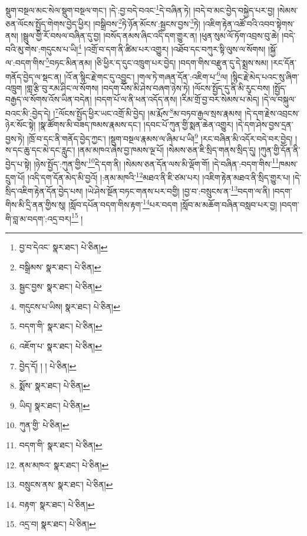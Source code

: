 སྡུག་བསྔལ་མང་སེལ་སྡུག་བསྔལ་གང་། །དེ་:བྱ་བདེ་བའང་\footnote{བྱ་བ་དེའང་  སྣར་ཐང་།  པེ་ཅིན། }དེ་བཞིན་ཏེ། །བདེ་བ་མང་བྱེད་བསྐྱེད་པར་བྱ། །སེམས་ཅན་ལོངས་སྤྱོད་གེགས་བྱེད་ཕྱིར། །བསྒྲིབས་\footnote{བསྒྲིམས་  སྣར་ཐང་།  པེ་ཅིན། }ཏེ་ཉོན་མོངས་:སྦྱངས་བྱས་\footnote{སྦྱང་བྱས་  སྣར་ཐང་།  པེ་ཅིན། }ཏེ། །འཇིག་རྟེན་འཚོ་བའི་འབབ་སྟེགས་ནས། །སྦྲུལ་གྱི་རོ་བསལ་བཞིན་དུ་བྱ། །བསོད་ནམས་ཞིང་འདི་དག་གྱུར་ན། །ཕུན་སུམ་ལོ་ཏོག་འབྲས་བུ་ཆེ། །བདེ་བའི་མུ་གེས་:གདུངས་པ་ཡི།\footnote{གདུངས་པ་ཡིས།  སྣར་ཐང་།  པེ་ཅིན། } །འགྲོ་བ་དག་ནི་ཚིམ་པར་འགྱུར། །འཐོབ་དང་བཀུར་སྟི་ལུས་ལ་སོགས། །སྐྱོ་ལ་:བདག་གིས་\footnote{བདག་གི་  སྣར་ཐང་།  པེ་ཅིན། }བཏང་མིན་ནམ། །ཅི་ཕྱིར་ད་དུང་འཁྲུག་པར་བྱེད། །བདག་གིས་བརྫུན་དུ་དེ་སྨྲས་སམ། །རང་དོན་གནོད་བྱེད་ལ་སྡང་ན། །འོ་ན་སྙིང་རྗེ་གང་དུ་འབྱུང་། །གལ་ཏེ་གཞན་དོན་:འཇིག་པ་\footnote{འཇོག་པ་  སྣར་ཐང་།  པེ་ཅིན། }ལ། །སྙིང་རྗེ་མེད་པའང་སུ་ཞིག་འཁྲུག །གླ་རྩི་བུ་རམ་ཤིང་ལ་སོགས། །བདག་པོས་མི་ཤེས་བཞག་ཉེས་ཏེ། །ལོངས་སྤྱོད་དུ་ནི་མི་རུང་བས། །སྤྱོད་བརྒྱད་ལ་སོགས་འོས་ཡིན་བདེན། །བདག་པོ་ལ་ནི་ཕན་འདོད་ནས། །རིམ་གྲོ་བྱ་བར་སེམས་པ་མེད། །དེ་ལ་བསྐུལ་བའང་མི་:བྱེད་དེ། །\footnote{བྱེད་དོ། ། །  པེ་ཅིན། }ལོངས་སྤྱོད་ཕྱིར་ཡང་འགྲོ་མི་བྱེད། །མ་རྨོས་\footnote{སྨོས་  སྣར་ཐང་།  པེ་ཅིན། }མ་བཏབ་རྒྱལ་སྲས་རྣམས། །དེ་དག་རྗེས་འབྲངས་ཉེར་སོང་སྟེ། །སྣ་ཚོགས་མི་བཟད་ཁམས་རྣམས་དང་། །དབང་པོ་ཀུན་གྱི་སྨན་ཆེན་འགྱུར། །དེ་དག་ཤེས་བྱས་དྲན་བྱས་ཏེ། །ཁྲོ་བ་དང་ནི་གནོད་བྱེད་ཀྱང་། །སྡུག་བསྔལ་རྣམས་ལ་ཞིམ་པ་ཡི།\footnote{ཡིད།  སྣར་ཐང་།  པེ་ཅིན། } །རང་བཞིན་མི་འདོར་བདེ་བར་བྱེད། །ས་དང་ཆུ་དང་མེ་དང་རླུང་། །ནམ་མཁའ་ཞེས་བྱ་ཁམས་ལྔ་པོ། །སེམས་ཅན་ཇི་སྲིད་གནས་སྲིད་དུ། །ཀུན་གྱི་དོན་ནི་བྱེད་པ་སྟེ། །ཉེས་སྤྱོད་:ཀུན་གྱིས་\footnote{ཀུན་གྱི་  པེ་ཅིན། }དེ་དག་ནི། །སེམས་ཅན་དོན་ལས་མི་ལྡོག་གོ། །དེ་བཞིན་:བདག་གིས་\footnote{བདག་གི་  སྣར་ཐང་།  པེ་ཅིན། }ཁམས་དྲུག་པོ། །འདི་དག་དོན་མེད་མི་བྱའོ། །:ནམ་མཁའི་\footnote{ནམ་མཁའ་  སྣར་ཐང་།  པེ་ཅིན། }མཐའ་ནི་ཇི་ཙམ་པར། །འཇིག་རྟེན་མཐའ་ནི་སྲིད་གྱུར་པ། །དེ་སྲིད་འཇིག་རྟེན་དོན་བྱེད་པས། །ཡེ་ཤེས་སྔོན་བཏང་གནས་པར་བགྱི། །བྱ་བ་:བསྲུངས་ན་\footnote{བསྲུངས་ནས་  སྣར་ཐང་།  པེ་ཅིན། }བདག་ལ་ནི། །བདག་གིས་མི་དྲི་ནན་གྱིས་སུ། །སློབ་དཔོན་བདག་གིས་རྟག་\footnote{བརྟག་  སྣར་ཐང་།  པེ་ཅིན། }པར་བདག །སློབ་མ་མཆོག་བཞིན་བསླབ་པར་བྱ། །བདག་གི་བླ་མ་བདག་:འདྲ་བར།\footnote{འདྲ་བ།  སྣར་ཐང་།  པེ་ཅིན། } །
